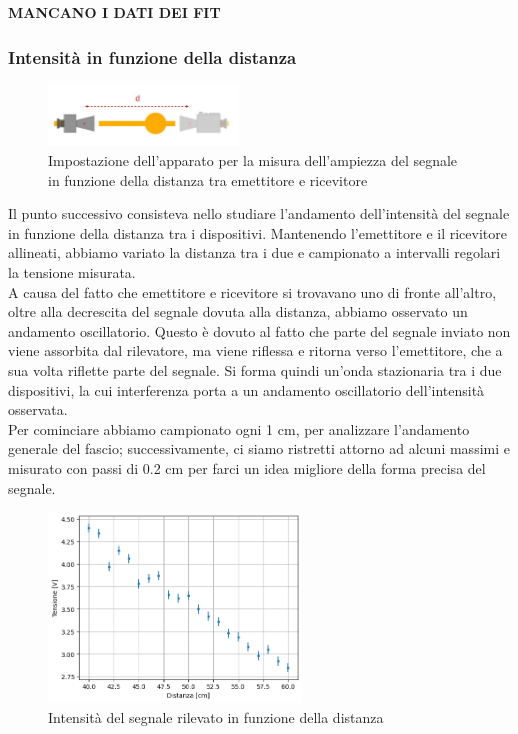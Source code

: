 \documentclass[letterpaper,12pt]{article}
\begin{document}
\newpage
\textbf{MANCANO I DATI DEI FIT}
\subsubsection{Intensità in funzione della distanza}
\begin{figure}[h!]
    \centering
    \includegraphics[width = 0.45\textwidth]{ampiezza distanza.jpg}
    \caption{Impostazione dell'apparato per la misura dell'ampiezza del segnale in funzione della distanza tra emettitore e ricevitore}
    \label{fig:ampiezza_distanza}
\end{figure}

Il punto successivo consisteva nello studiare l'andamento dell'intensità del segnale in funzione della distanza tra i
dispositivi. Mantenendo l'emettitore e il ricevitore allineati, abbiamo variato la distanza tra i due
e campionato a intervalli regolari la tensione misurata.\\
A causa del fatto che emettitore e ricevitore si trovavano uno di fronte all'altro, oltre alla decrescita
del segnale dovuta alla distanza, abbiamo osservato un andamento oscillatorio. Questo è dovuto al fatto che
parte del segnale inviato non viene assorbita dal rilevatore, ma viene riflessa e ritorna verso l'emettitore,
che a sua volta riflette parte del segnale. Si forma quindi un'onda stazionaria tra i due dispositivi,
la cui interferenza porta a un andamento oscillatorio dell'intensità osservata.\\
Per cominciare abbiamo campionato ogni 1 cm, per analizzare l'andamento generale del fascio; successivamente,
ci siamo ristretti attorno ad alcuni massimi e misurato con passi di 0.2 cm per farci un idea migliore della forma precisa del segnale.\\

\begin{figure}[h!]
	\centering
	\includegraphics[width = 0.6\textwidth]{dati_distanza.png}
	\caption{Intensità del segnale rilevato in funzione della distanza}
	\label{fig:distanza}
\end{figure}
\end{document}
